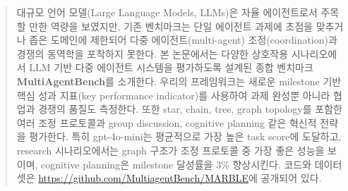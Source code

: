 \documentclass[11pt]{article}
\begin{document}
\begin{abstract}
대규모 언어 모델(Large Language Models, LLMs)은 자율 에이전트로서 주목할 만한 역량을 보였지만, 기존 벤치마크는 단일 에이전트 과제에 초점을 맞추거나 좁은 도메인에 제한되어 다중 에이전트(multi-agent) 조정(coordination)과 경쟁의 동역학을 포착하지 못한다. 본 논문에서는 다양한 상호작용 시나리오에서 LLM 기반 다중 에이전트 시스템을 평가하도록 설계된 종합 벤치마크 \textbf{MultiAgentBench}를 소개한다. 우리의 프레임워크는 새로운 milestone 기반 핵심 성과 지표(key performance indicator)를 사용하여 과제 완성뿐 아니라 협업과 경쟁의 품질도 측정한다. 또한 star, chain, tree, graph topology를 포함한 여러 조정 프로토콜과 group discussion, cognitive planning 같은 혁신적 전략을 평가한다. 특히 gpt-4o-mini는 평균적으로 가장 높은 task score에 도달하고, research 시나리오에서는 graph 구조가 조정 프로토콜 중 가장 좋은 성능을 보이며, cognitive planning은 milestone 달성률을 3\% 향상시킨다. 코드와 데이터셋은 \url{https://github.com/MultiagentBench/MARBLE}에 공개되어 있다.

\end{abstract}









\clearpage

\end{document}
